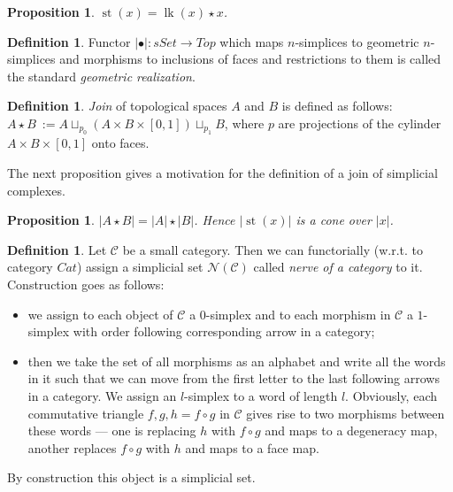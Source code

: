 \documentclass[english,12pt]{article}
\newcounter{stmcounter}[section]
\numberwithin{equation}{section}
\newtheorem{proposition}[stmcounter]{Proposition}
\theoremstyle{definition}
\newtheorem{definition}[stmcounter]{Definition}
\theoremstyle{remark}
\newcommand{\define}[1]{{\textit{#1}}}
\begin{document}
\begin{proposition}
  $\operatorname{st}(x) = \operatorname{lk}(x) \star x$.
\end{proposition}

\begin{definition}
  Functor $\left|\bullet\right| : sSet \to Top$ which maps $n$-simplices to geometric $n$-simplices and morphisms to inclusions of faces and restrictions to them is called the standard \define{geometric realization}.
\end{definition}

\begin{definition}
  \define{Join} of topological spaces $A$ and $B$ is defined as follows: $A \star B\ := A \sqcup_{p_0} (A \times B \times [0,1]) \sqcup_{p_1} B$, where $p$ are projections of the cylinder $A \times B \times [0,1]$ onto faces.
\end{definition}

The next proposition gives a motivation for the definition of a join of simplicial complexes.

\begin{proposition}
  $\left|A \star B\right| = \left|A\right| \star \left|B\right|$. Hence $\left|\operatorname{st}(x)\right|$ is a cone over $\left|x\right|$.
\end{proposition}


\begin{definition}
  Let $\mathcal{C}$ be a small category. Then we can functorially (w.r.t. to category $Cat$) assign a simplicial set $\mathcal{N}(\mathcal{C})$ called \define{nerve of a category} to it.\\

  Construction goes as follows:
  \begin{itemize}
    \item we assign to each object of $\mathcal{C}$ a $0$-simplex and to each morphism in $\mathcal{C}$ a $1$-simplex with order following corresponding arrow in a category;
    \item then we take the set of all morphisms as an alphabet and write all the words in it such that we can move from the first letter to the last following arrows in a category. We assign an $l$-simplex to a word of length $l$. Obviously, each commutative triangle $f, g, h = f \circ g$ in $\mathcal{C}$ gives rise to two morphisms between these words --- one is replacing $h$ with $f \circ g$ and maps to a degeneracy map, another replaces $f \circ g$ with $h$ and maps to a face map.
  \end{itemize}

  By construction this object is a simplicial set.
\end{definition}
\end{document}
